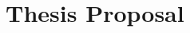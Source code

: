 \documentclass[11pt,twoside,final]{mitthesis}
\begin{document}



\maketitle

%






\chapter{Thesis Proposal}%









\begin{spacing}{1}
{}

\end{spacing}
\end{document}
